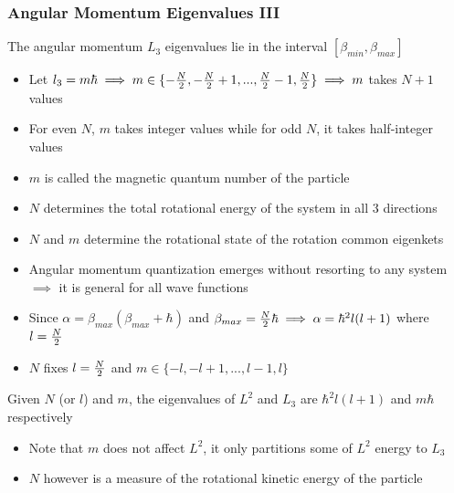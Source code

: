 \documentclass[8pt,t,mathserif,aspectratio=169]{beamer}
\begin{document}
\begin{frame}
  \frametitle{Angular Momentum Eigenvalues III}
  \vspace{1mm}
  The angular momentum $L_3$ eigenvalues lie in the interval $[\beta_{min},\beta_{max}]$
  \begin{itemize}
    \item Let $l_3 = m \hbar \implies m \in \{-{N \over 2},-{N \over 2} + 1, ... ,{N \over 2} - 1,{N \over 2}\} \implies m$ takes $N + 1$ values
    \item For even $N$, $m$ takes integer values while for odd $N$, it takes half-integer values
    \item $m$ is called the magnetic quantum number of the particle
    \item $N$ determines the total rotational energy of the system in all $3$ directions
    \item $N$ and $m$ determine the rotational state of the rotation common eigenkets
    \item Angular momentum quantization emerges without resorting to any system $\implies$ it is general for all wave functions
    \item Since $\alpha = \beta_{max} (\beta_{max} + \hbar)$ and $\beta_{max} = {N \over 2} \hbar \implies \alpha = \hbar^2 l (l + 1)$ where $l = {N \over 2}$
    \item $N$ fixes $l = {N \over 2}$ and $m \in \{-l,-l + 1, ... ,l - 1,l\}$
  \end{itemize}
  Given $N$ (or $l$) and $m$, the eigenvalues of $L^2$ and $L_3$ are $\hbar^2 l (l + 1)$ and $m \hbar$ respectively
  \begin{itemize}
    \item Note that $m$ does not affect $L^2$, it only partitions some of $L^2$ energy to $L_3$
    \item $N$ however is a measure of the rotational kinetic energy of the particle
  \end{itemize}
\end{frame}
\end{document}

